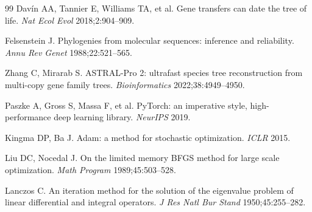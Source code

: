 \documentclass[11pt]{article}
\begin{document}
\begin{thebibliography}{99}
 Dav\'in AA, Tannier E, Williams TA, et al. Gene transfers
can date the tree of life. \emph{Nat Ecol Evol} 2018;2:904--909.

 Felsenstein J. Phylogenies from molecular sequences:
inference and reliability. \emph{Annu Rev Genet} 1988;22:521--565.

 Zhang C, Mirarab S. ASTRAL-Pro 2: ultrafast species tree
reconstruction from multi-copy gene family trees.
\emph{Bioinformatics} 2022;38:4949--4950.

 Paszke A, Gross S, Massa F, et al. PyTorch: an imperative
style, high-performance deep learning library. \emph{NeurIPS} 2019.

 Kingma DP, Ba J. Adam: a method for stochastic
optimization. \emph{ICLR} 2015.

 Liu DC, Nocedal J. On the limited memory BFGS method
for large scale optimization. \emph{Math Program} 1989;45:503--528.

 Lanczos C. An iteration method for the solution of the
eigenvalue problem of linear differential and integral operators.
\emph{J Res Natl Bur Stand} 1950;45:255--282.

\end{thebibliography}
\end{document}
